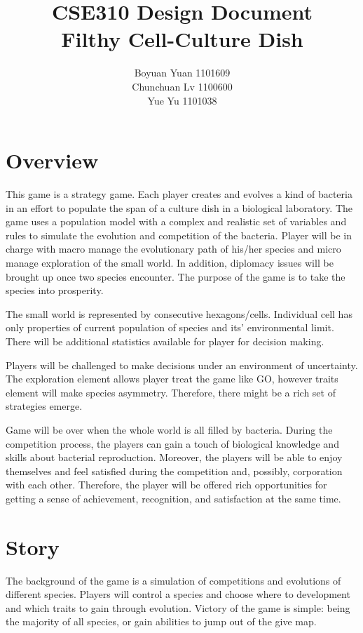 \documentclass[12pt,a4paper]{article}
\title{
	CSE310 Design Document\\
	Filthy Cell-Culture Dish\\
	}
\author{Boyuan Yuan	1101609\\
		Chunchuan Lv 1100600\\
		Yue Yu	1101038\\
		}
\begin{document}
\maketitle
\newpage
\tableofcontents
\newpage
\section{Overview}

This game is a strategy game. Each player creates and evolves a kind of bacteria in an effort to populate the span of a culture dish in a biological laboratory. The game uses a population model with a complex and realistic set of variables and rules to simulate the evolution and competition of the bacteria. Player will be in charge with macro manage the evolutionary path of his/her species and micro manage exploration of the small world. In addition, diplomacy issues will be brought up once two species encounter. The purpose of the game is to take the species into prosperity.

The small world is represented by consecutive hexagons/cells. Individual cell has only properties of current population of species and its' environmental limit. There will be additional statistics available for player for decision making.

Players will be challenged to make decisions under an environment of uncertainty. The exploration element allows player treat the game like GO, however traits element will make species asymmetry. Therefore, there might be a rich set of strategies emerge.

Game will be over when the whole world is all filled by bacteria. During the competition process, the players can gain a touch of biological knowledge and skills about bacterial reproduction. Moreover, the players will be able to enjoy themselves and feel satisfied during the competition and, possibly, corporation with each other. Therefore, the player will be offered rich opportunities for getting a sense of achievement, recognition, and satisfaction at the same time.


\section{Story}
The background of the game is a simulation of competitions and evolutions of different species. Players will control a species and choose where to development and which traits to gain through evolution. Victory of the game is simple: being the majority of all species, or gain abilities to jump out of the give map.
\end{document}
